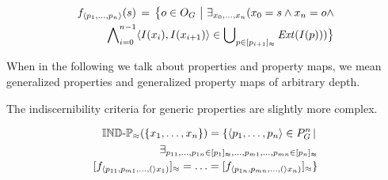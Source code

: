 \small
\begin{definition}
\begin{align}
\label{def:generalized_property_map}
  f_{\langle p_1,\ldots,p_n\rangle}(s)
\,=\,
  \big\{o \in O_G\,\,\big\vert\,\,
    \exists_{x_0,\ldots,x_n}(
      x_0 = s \land x_n = o \land\nonumber\\
      \bigwedge_{i=0}^{n-1}\nolimits
          \langle I(x_i),I(x_{i+1})\rangle
        \in
          \bigcup_{p \in [p_{i+1}]_{\approx}}\nolimits \mathit{Ext}(I(p))
    )
  \big\}\nonumber
\end{align}
\end{definition}
\normalsize

When in the following we talk about properties and property maps,
  we mean generalized properties and generalized property maps
  of arbitrary depth.

The indiscernibility criteria for generic properties
  are slightly more complex.

\small
\begin{definition}
\label{def:indiscernibility_criteria}
\begin{align}
  \indp_{\approx}(\set{\range{x_1}{x_n}})
=
  \setdef{
    \tuplerange{p_1}{p_n} \in P_G^n
  }{\\
    \exists_{
        \range{p_{11}}{p_{1n}} \in \equivset{p_1},
      \ldots,
        \range{p_{m1}}{p_{mn}} \in \equivset{p_n}
    }\nonumber\\
      \equivset{f_{\tuplerange{p_{11},p_{m1}} (x_1)}}
    =
      \ldots
    =
      \equivset{f_{\tuplerange{p_{1n},p_{mn}} (x_n)}}
  }\nonumber
\end{align}
\end{definition}
\normalsize

